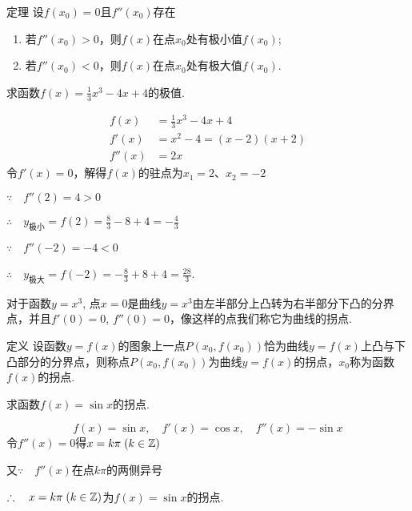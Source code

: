 \begin{thm}
    {定理} 设$f(x_0)=0$且$f''(x_0)$存在
\begin{enumerate}[(1)]
\item 若$f''(x_0)>0$，则$f(x)$在点$x_0$处有极小值$f(x_0)$;
\item 若$f''(x_0)<0$，则$f(x)$在点$x_0$处有极大值$f(x_0)$.
\end{enumerate}
\end{thm}


\begin{example}
    求函数$f(x)=\frac{1}{3}x^3-4x+4$的极值.
\end{example}

\begin{solution}
\[\begin{split}
    f(x)&=\frac{1}{3}x^3-4x+4\\
f'(x)&=x^2-4=(x-2)(x+2)\\
f''(x)&=2x
\end{split}\]
令$f'(x)=0$，解得$f(x)$的驻点为$x_1=2$、$x_2=-2$

$\because\quad f''(2)=4>0$

$\therefore\quad y_{\text{极小}}=f(2)=\frac{8}{3}-8+4=-\frac{4}{3}$

$\because\quad f''(-2)=-4<0$

$\therefore\quad y_{\text{极大}}=f(-2)=-\frac{8}{3}+8+4=\frac{28}{3}$.

对于函数$y=x^3$, 点$x=0$是曲线$y=x^3$由左半部分上凸转为右半部分下凸的分界点，并且$f'(0)=0$, $f''(0)=0$，像这样的点我们称它为曲线的拐点.
\end{solution}

\begin{thm}
    {定义} 设函数$y=f(x)$的图象上一点$P(x_0,f(x_0))$恰为曲线$y=f(x)$上凸与下凸部分的分界点，则称点$P(x_0, f(x_0))$为曲线$y=f(x)$的拐点，$x_0$称为函数$f(x)$的拐点.
\end{thm}



\begin{example}
    求函数$f(x)=\sin x$的拐点.
\end{example}

\begin{solution}
    \[f(x)=\sin x,\quad f'(x)=\cos x,\quad f''(x)=-\sin x\]
令$f''(x)=0$得$x=k\pi\; (k\in\mathbb{Z})$

又$\because\quad f''(x)$在点$k\pi$的两侧异号

$\therefore\quad x=k\pi\; (k\in\mathbb{Z})$为$f(x)=\sin x$的拐点.
\end{solution}

